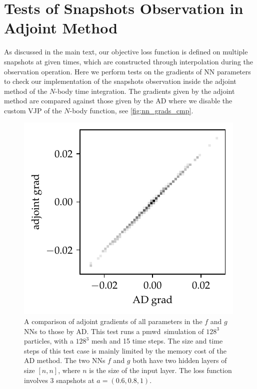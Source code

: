 \documentclass[modern, trackchanges, dvipsnames]{aastex631}
\newcommand{\pmwd}{{\usefont{T1}{nova}{m}{sl}pmwd}}
\begin{document}




\vspace{1em}
\appendix


\vspace{1em}
\section{Tests of Snapshots Observation in Adjoint Method}
As discussed in the main text, our objective loss function is defined on
multiple snapshots at given times, which are constructed through interpolation
during the observation operation.
Here we perform tests on the gradients of NN parameters to check our
implementation of the snapshots observation inside the adjoint method of the
$N$-body time integration.
The gradients given by the adjoint method are compared against those given by
the AD where we disable the custom VJP of the $N$-body function, see
\autoref{fig:nn_grads_cmp}.

\begin{figure}
  \centering
  \includegraphics[width=0.5\linewidth]{nn_grads_cmp.pdf}
  \caption{A comparison of adjoint gradients of all parameters in the $f$ and
  $g$ NNs to those by AD.
  This test runs a \pmwd\ simulation of $128^3$ particles, with a $128^3$ mesh
  and 15 time steps.
  The size and time steps of this test case is mainly limited by the memory cost
  of the AD method.
  The two NNs $f$ and $g$ both have two hidden layers of size $[n, n]$, where
  $n$ is the size of the input layer.
  The loss function involves 3 snapshots at $a=(0.6, 0.8, 1)$.
  }
  \label{fig:nn_grads_cmp}
\end{figure}


\end{document}
